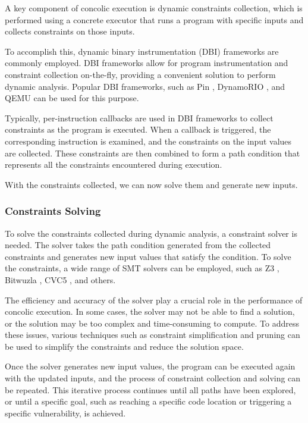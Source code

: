 A key component of concolic execution is dynamic constraints collection, which is performed using a concrete executor that runs a program with specific inputs and collects constraints on those inputs.

To accomplish this, dynamic binary instrumentation (DBI) frameworks are commonly employed. DBI frameworks allow for program instrumentation and constraint collection on-the-fly, providing a convenient solution to perform dynamic analysis. Popular DBI frameworks, such as Pin \cite{pintool-2005}, DynamoRIO \cite{dynamorio-thesis}, and QEMU \cite{qemu-usenix2005} can be used for this purpose.

Typically, per-instruction callbacks are used in DBI frameworks to collect constraints as the program is executed. When a callback is triggered, the corresponding instruction is examined, and the constraints on the input values are collected. These constraints are then combined to form a path condition that represents all the constraints encountered during execution.

With the constraints collected, we can now solve them and generate new inputs.

\subsubsection{Constraints Solving}

To solve the constraints collected during dynamic analysis, a constraint solver is needed. The solver takes the path condition generated from the collected constraints and generates new input values that satisfy the condition. To solve the constraints, a wide range of SMT solvers can be employed, such as Z3 \cite{z3-smt-solver}, Bitwuzla \cite{bitwuza-smt-comp-2020}, CVC5 \cite{cvc5-smt-solver}, and others.

The efficiency and accuracy of the solver play a crucial role in the performance of concolic execution. In some cases, the solver may not be able to find a solution, or the solution may be too complex and time-consuming to compute. To address these issues, various techniques such as constraint simplification and pruning can be used to simplify the constraints and reduce the solution space.

Once the solver generates new input values, the program can be executed again with the updated inputs, and the process of constraint collection and solving can be repeated. This iterative process continues until all paths have been explored, or until a specific goal, such as reaching a specific code location or triggering a specific vulnerability, is achieved.

